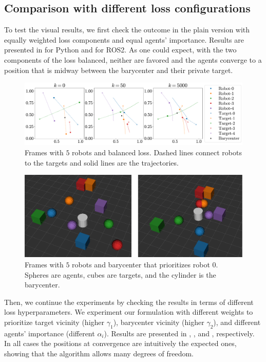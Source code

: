\documentclass[a4paper,11pt,oneside]{book}
\begin{document}
\subsection{Comparison with different loss configurations}

To test the visual results, we first check the outcome in the plain version with equally weighted loss components and equal agents' importance. Results are presented in  for Python and  for ROS2. As one could expect, with the two components of the loss balanced, neither are favored and the agents converge to a position that is midway between the barycenter and their private target.
\begin{figure}[h!]
      \centering
      \includegraphics[width=0.9\linewidth]{./figs/aggregative/plain_anim/anim.pdf} 
      \caption{Frames with $5$ robots and balanced loss. Dashed lines connect robots to the targets and solid lines are the trajectories.}
      \label{fig:anim_plain}
\end{figure}

\begin{figure}[h!]
      \centering
      \includegraphics[width=0.75\linewidth]{./figs/aggregative/plain_anim/ros2.png} 
      \caption{Frames with $5$ robots and barycenter that prioritizes robot $0$. Spheres are agents, cubes are targets, and the cylinder is the barycenter.}
      \label{fig:anim_plain_ros2}
\end{figure}

Then, we continue the experiments by checking the results in terms of different loss hyperparameters. We experiment our formulation with different weights to prioritize target vicinity (higher $\gamma_1$), barycenter vicinity (higher $\gamma_2$), and different agents' importance (different $\alpha_i$). Results are presented in , , and , respectively. In all cases the positions at convergence are intuitively the expected ones, showing that the algorithm allows many degrees of freedom.
\end{document}

